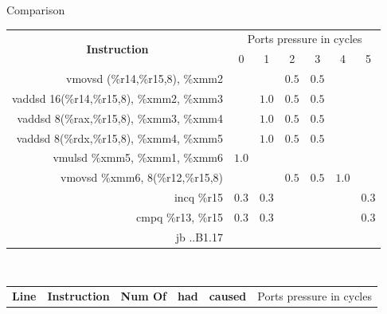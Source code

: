 \documentclass[10pt, tikz,border=2mm, xcolor=dvipsnames]{beamer}
\begin{document}
\begin{frame}[fragile]{Comparison}
\begin{mdframed}[backgroundcolor=light-gray, roundcorner=10pt,leftmargin=1, rightmargin=1, innerleftmargin=15, innertopmargin=5,innerbottommargin=5, outerlinewidth=1, linecolor=light-gray]
    \centering
     \begin{adjustbox}{height=0.2\textheight,width=0.85\textwidth} \begin{tabular}
            {|r|c|c|c|c|c|c|}
            \hline
            \multicolumn{1}{|c|}{\multirow{2}{*}{\textbf{Instruction}}} & \multicolumn{6}{|c|}{Ports pressure in cycles}\\
            \cline{2-7}
            & 0 & 1 & 2 & 3 & 4 & 5 \\ \cline{1-7}
            vmovsd  (\%r14,\%r15,8), \%xmm2           &       &       & $0.5$ & $0.5$ &       &       \\
            vaddsd  16(\%r14,\%r15,8), \%xmm2, \%xmm3 &       & $1.0$ & $0.5$ & $0.5$ &       &       \\
            vaddsd  8(\%rax,\%r15,8), \%xmm3, \%xmm4  &       & $1.0$ & $0.5$ & $0.5$ &       &       \\
            vaddsd  8(\%rdx,\%r15,8), \%xmm4, \%xmm5  &       & $1.0$ & $0.5$ & $0.5$ &       &       \\
            vmulsd  \%xmm5, \%xmm1, \%xmm6            & $1.0$ &       &       &       &       &       \\
            vmovsd  \%xmm6, 8(\%r12,\%r15,8)          &       &       & $0.5$ & $0.5$ & $1.0$ &       \\
            incq    \%r15                             & $0.3$ & $0.3$ &       &       &       & $0.3$ \\
            cmpq    \%r13, \%r15                      & $0.3$ & $0.3$ &       &       &       & $0.3$ \\
            jb      ..B1.17                           &       &       &       &       &       &       \\
            \hline
    \end{tabular}\end{adjustbox}\\ \vspace{0.5cm}
    \begin{adjustbox}{height=0.17\textheight,width=0.85\textwidth} \begin{tabular}
            {|c|c|c|c|c|c|c|c|c|c|c|}
            \hline
            \multicolumn{1}{|c|}{\multirow{2}{*}{\textbf{Line}}}&\multicolumn{1}{|c|}{\multirow{2}{*}{\textbf{Instruction}}}&\textbf{Num Of}& \textbf{had} & \textbf{caused} & \multicolumn{6}{|c|}{Ports pressure in cycles}\\

\end{tabular}
\end{adjustbox}
\end{mdframed}
\end{frame}
\end{document}
